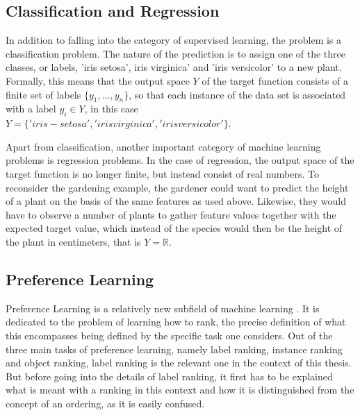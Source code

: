 \subsection{Classification and Regression}
In addition to falling into the category of supervised learning, the problem is a classification problem. The nature of the prediction is to assign one of the three classes, or labels, 'iris setosa', iris virginica' and 'iris versicolor' to a new plant. Formally, this means that the output space $Y$ of the target function consists of a finite set of labels $\lbrace y_1,\dots,y_n\rbrace$, so that each instance of the data set is associated with a label $y_i \in Y$, in this case $Y=\lbrace 'iris-setosa','iris virginica', 'iris versicolor' \rbrace $. 

Apart from classification, another important category of machine learning problems is regression problems. In the case of regression, the output space of the target function is no longer finite, but instead consist of real numbers. To reconsider the gardening example, the gardener could want to predict the height of a plant on the basis of the same features as used above. Likewise, they would have to observe a number of plants to gather feature values together with the expected target value, which instead of the species would then be the height of the plant in centimeters, that is $Y=\mathbb{R}$.


\subsection{Preference Learning}
Preference Learning is a relatively new subfield of machine learning \cite{DBLP:books/daglib/0025729}. It is dedicated to the problem of learning how to rank, the precise definition of what this encompasses being defined by the specific task one considers. Out of the three main tasks of preference learning, namely label ranking, instance ranking and object ranking, label ranking is the relevant one in the context of this thesis. But before going into the details of label ranking, it first has to be explained what is meant with a ranking in this context and how it is distinguished from the concept of an ordering, as it is easily confused.

